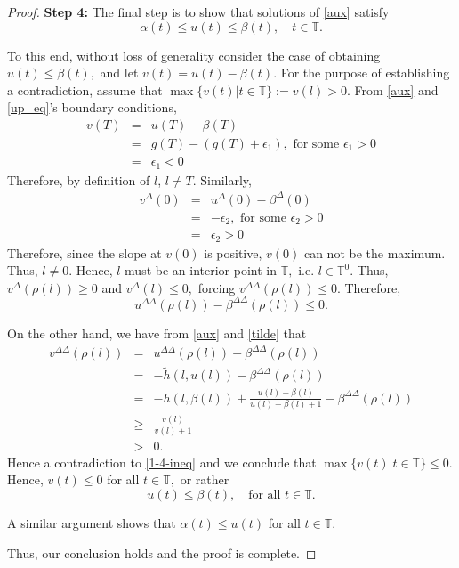 \documentclass[12pt,reqno]{amsart}
\begin{document}
\begin{proof}
\textbf{Step 4:} The final step is to show that solutions of \eqref{aux} satisfy $$\alpha(t) \leq u(t) \leq \beta(t), \quad t \in \mathbb{T}.$$
	
	To this end, without loss of generality consider the case of obtaining $u(t) \leq \beta(t),$ and let $v(t) = u(t) - \beta(t).$  For the purpose of establishing a contradiction, assume that $\max\{v(t) | t \in \mathbb{T}\} := v(l) > 0.$
	From \eqref{aux} and \eqref{up_eq}'s boundary conditions,
 \begin{eqnarray*}
   v(T) & = & u(T)-\beta(T)  \\
        & = & g (T) - (g(T)+\epsilon_1), \mbox{ for some } \epsilon_1 >0\\
   & = & \epsilon_1 < 0
 \end{eqnarray*}
 Therefore, by definition of $l$, $l \neq T$. Similarly, 
 \begin{eqnarray*}
     v^{\Delta}(0) & = & u^{\Delta}(0)-\beta^{\Delta}(0)  \\
        & = & -\epsilon_2, \mbox{ for some } \epsilon_2 >0\\
   & = & \epsilon_2 > 0
 \end{eqnarray*}
 Therefore, since the slope at $v(0)$ is positive, $v(0)$ can not be the maximum. Thus, $l \neq 0$. Hence, $l$ must be an interior point in $\mathbb{T},$ i.e. $l \in \mathbb{T}^0.$  Thus, $v^{\Delta}(\rho(l)) \geq 0$ and $v^{\Delta}(l) \leq 0,$ forcing $v^{\Delta \Delta}(\rho(l)) \leq 0.$  
		Therefore,
	\begin{equation}\label{1-4-ineq}
	u^{\Delta\Delta}(\rho(l)) - \beta^{\Delta\Delta}(\rho(l)) \leq 0.
	\end{equation}
	
	On the other hand, we have from \eqref{aux} and \eqref{tilde} that
   	\begin{eqnarray*}
		v^{\Delta \Delta}(\rho(l)) & = & u^{\Delta\Delta}(\rho(l)) - \beta^{\Delta\Delta}(\rho(l)) \\
		& = & -\tilde{h}(l, u(l)) - \beta^{\Delta\Delta}(\rho(l)) \\
		& = & -h(l, \beta(l)) + \frac{u(l) - \beta(l)}{u(l) - \beta(l) + 1} - \beta^{\Delta\Delta}(\rho(l)) \\
    	& \geq & \frac{v(l)}{v(l)+1} \\
    	& > & 0.
	\end{eqnarray*} 
	Hence a contradiction to \eqref{1-4-ineq} and we conclude that $\max\{v(t) | t \in \mathbb{T}\} \leq 0.$  Hence, $v(t) \leq 0$ for all $t \in \mathbb{T},$ or rather $$u(t) \leq \beta(t), \quad \text{for all } t \in \mathbb{T}.$$
	
	A similar argument shows that $\alpha(t) \leq u(t)$ for all $t \in \mathbb{T}.$
	
	Thus, our conclusion holds and the proof is complete.	
\end{proof}
\end{document}

